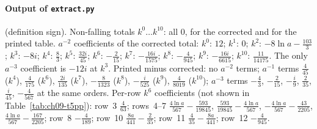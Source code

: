\paragraph{Output of \texttt{extract.py}} (definition sign). Non-falling totals $k^0\ldots k^{10}$: all $0$, for the corrected and for the printed table.
$a^{-2}$ coefficients of the corrected total: $k^0$: $12$; $k^1$: $0$; $k^2$: $-8\ln a-\frac{103}3$; $k^3$: $-8i$; $k^4$: $\frac83$; $k^5$: $\frac{32i}{45}$; $k^6$: $-\frac2{15}$;
$k^7$: $-\frac{16i}{1575}$; $k^8$: $-\frac4{945}$; $k^9$: $-\frac{16i}{6615}$; $k^{10}$: $\frac{11}{14175}$. The only $a^{-3}$ coefficient is $-12i$ at $k^3$.
Printed minus corrected: no $a^{-2}$ terms; $a^{-1}$ terms $\frac4{45}$ ($k^4$), $\frac4{175}$ ($k^6$), $\frac{2i}{135}$ ($k^7$), $-\frac8{1323}$ ($k^8$), $-\frac{i}{525}$ ($k^9$), $\frac4{8019}$ ($k^{10}$);
$a^{-3}$ terms $-\frac43$, $-\frac2{15}$, $-\frac i9$, $\frac2{35}$, $\frac{i}{45}$, $-\frac4{567}$ at the same orders.
Per-row $k^6$ coefficients (not shown in Table~\ref{tab:ch09-t5pp}): row~3 $\frac4{63}$; rows~4--7 $\frac{4\ln a}{567}-\frac{593}{19845}$, $\frac{593}{19845}-\frac{4\ln a}{567}$, $-\frac{4\ln a}{567}-\frac{43}{2205}$, $\frac{4\ln a}{567}-\frac{167}{2205}$;
row~8 $-\frac4{189}$; row~10 $\frac{8a}{441}-\frac2{35}$; row~11 $\frac4{35}-\frac{8a}{441}$; row~12 $-\frac4{945}$.

